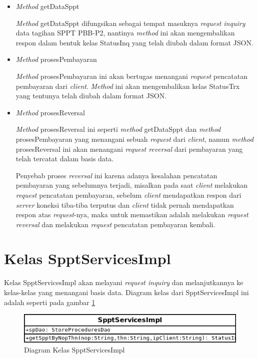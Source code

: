 \begin{itemize}
\begin{itemize}
    \item \textit{Method} getDataSppt
    
    \textit{Method} getDataSppt difungsikan sebagai tempat masuknya \textit{request inquiry} data tagihan SPPT PBB-P2, nantinya \textit{method} ini akan mengembalikan respon dalam bentuk kelas StatusInq yang telah diubah dalam format JSON.
    
    \item \textit{Method} prosesPembayaran
    
    \textit{Method} prosesPembayaran ini akan bertugas menangani \textit{request} pencatatan pembayaran dari \textit{client}. \textit{Method} ini akan mengembalikan kelas StatusTrx yang tentunya telah diubah dalam format JSON.
    
    \item \textit{Method} prosesReversal
    
    \textit{Method} prosesReversal ini seperti \textit{method} getDataSppt dan \textit{method} prosesPembayaran yang menangani sebuah \textit{request} dari \textit{client}, namun \textit{method} prosesReversal ini akan menangani \textit{request reversal} dari pembayaran yang telah tercatat dalam basis data.
    
    Penyebab proses \textit{reversal} ini karena adanya kesalahan pencatatan pembayaran yang sebelumnya terjadi, misalkan pada saat \textit{client} melakukan \textit{request} pencatatan pembayaran, sebelum \textit{client} mendapatkan respon dari \textit{server} koneksi tiba-tiba terputus dan \textit{client} tidak pernah mendapatkan respon atas \textit{request}-nya, maka untuk memastikan adalah melakukan \textit{request reversal} dan melakukan \textit{request} pencatatan pembayaran kembali.
    
  \end{itemize}
\end{itemize}

\section{Kelas SpptServicesImpl}

Kelas SpptServicesImpl akan melayani \textit{request inquiry} dan melanjutkannya ke kelas-kelas yang menangani basis data. Diagram kelas dari SpptServicesImpl ini adalah seperti pada gambar \ref{fig:uml-class-SpptServicesImpl}

\begin{figure}[H]
  \centering
  \includegraphics[width=1\textwidth]{./resources/uml/uml-class-SpptServicesImpl}
  \caption{Diagram Kelas SpptServicesImpl}
  \label{fig:uml-class-SpptServicesImpl}
\end{figure}

